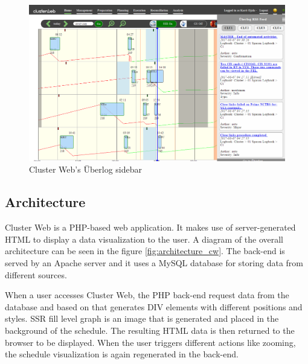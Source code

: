 \begin{figure}[ht]
  \begin{center}
    \includegraphics*[width=1\textwidth]{clusterweb_uberlog}
  \end{center}
  \caption{Cluster Web's Überlog sidebar}
  \label{fig:clusterweb_uberlog}
\end{figure}

\subsection{Architecture}
Cluster Web is a PHP-based web application. It makes use of server-generated HTML to display a data visualization to the user. A diagram of the overall architecture can be seen in the figure \ref{fig:architecture_cw}. The back-end is served by an Apache server and it uses a MySQL database for storing data from different sources.

When a user accesses Cluster Web, the PHP back-end request data from the database and based on that generates DIV elements with different positions and styles. SSR fill level graph is an image that is generated and placed in the background of the schedule. The resulting HTML data is then returned to the browser to be displayed. When the user triggers different actions like zooming, the schedule visualization is again regenerated in the back-end.

